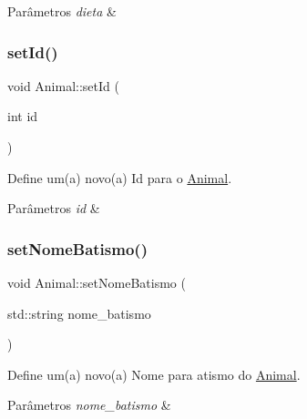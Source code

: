 \begin{DoxyParams}{Parâmetros}
{\em dieta} & \\
\hline
\end{DoxyParams}
\mbox{\label{classAnimal_af5a262e8a6e04632a48307101494925c}} 
\subsubsection{\texorpdfstring{set\+Id()}{setId()}}
{\footnotesize\ttfamily void Animal\+::set\+Id (\begin{DoxyParamCaption}\item[{int}]{id }\end{DoxyParamCaption})}



Define um(a) novo(a) Id para o \hyperlink{classAnimal}{Animal}. 


\begin{DoxyParams}{Parâmetros}
{\em id} & \\
\hline
\end{DoxyParams}
\mbox{\label{classAnimal_a6f77d89ef0c02d85dfe1dd7508122ce3}} 
\subsubsection{\texorpdfstring{set\+Nome\+Batismo()}{setNomeBatismo()}}
{\footnotesize\ttfamily void Animal\+::set\+Nome\+Batismo (\begin{DoxyParamCaption}\item[{std\+::string}]{nome\+\_\+batismo }\end{DoxyParamCaption})}



Define um(a) novo(a) Nome para atismo do \hyperlink{classAnimal}{Animal}. 


\begin{DoxyParams}{Parâmetros}
{\em nome\+\_\+batismo} & \\
\hline
\end{DoxyParams}
\mbox{\label{classAnimal_ad2e0ffb0dcb6b58467010d9f11488899}} 
